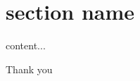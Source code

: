 \documentclass{beamer}
\makeatletter
\def\beamer@writeslidentry@miniframesoff{%
  \expandafter\beamer@ifempty\expandafter{\beamer@framestartpage}{}%
  {%
    \clearpage\beamer@notesactions%
  }
}
\newcommand*{\miniframesoff}{\let\beamer@writeslidentry=\beamer@writeslidentry@miniframesoff}
\makeatother
\begin{document}
\begin{frame}[plain]
\titlepage
\end{frame}

\begin{frame}
\tableofcontents
\end{frame}

\section{section name}
\begin{frame}
content...
\end{frame}

\miniframesoff

\begin{frame}
Thank you
\end{frame}
\end{document}
